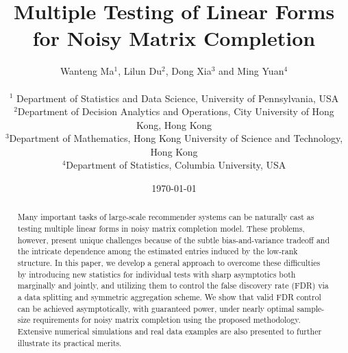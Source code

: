 \documentclass[12pt]{article}
\title{Multiple Testing of Linear Forms for Noisy Matrix Completion}
\author{Wanteng Ma$^1$, Lilun Du$^2$, Dong Xia$^3$ and Ming Yuan$^4$\\
~ \\
{\small $^{1}$ Department of Statistics and Data Science, University of Pennsylvania, USA}\\
{\small $^2$Department of Decision Analytics and Operations,  City University of Hong Kong, Hong Kong}\\
{\small $^{3}$Department of Mathematics, Hong Kong University of Science and Technology, Hong Kong}\\
{\small $^4$Department of Statistics,  Columbia University, USA}\\
}
\date{\today\\
} %
\theoremstyle{plain}
\begin{document}
\maketitle


\begin{abstract}
Many important tasks of large-scale recommender systems can be naturally cast as testing multiple linear forms in noisy matrix completion model. These problems, however, present unique challenges because of the subtle bias-and-variance tradeoff and the intricate dependence among the estimated entries induced by the low-rank structure. In this paper, we develop a general approach to overcome these difficulties by introducing new statistics for individual tests with sharp asymptotics both marginally and jointly, and utilizing them to control the false discovery rate (FDR) via a data splitting and symmetric aggregation scheme. We show that valid FDR control can be achieved asymptotically, with guaranteed power, under nearly optimal sample-size requirements for noisy matrix completion using the proposed methodology. Extensive numerical simulations and real data examples are also presented to further illustrate its practical merits.
\end{abstract}
\end{document}

